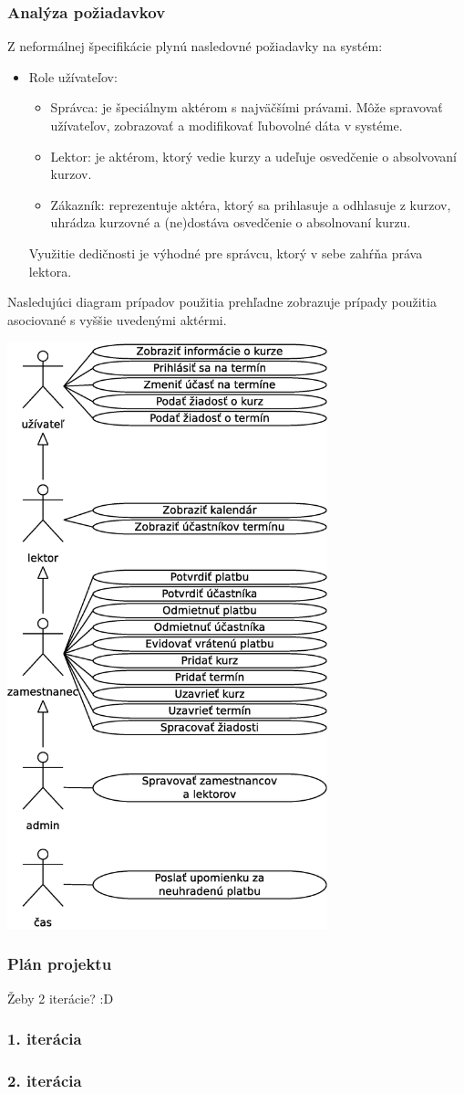 \documentclass[12pt,a4paper,titlepage,final]{report}
\begin{document}
	\subsubsection{Analýza požiadavkov}
Z neformálnej špecifikácie plynú nasledovné požiadavky na systém:
		\begin{itemize}
			\item Role užívateľov:
			\begin{itemize}
				\item Správca: je špeciálnym aktérom s najväčšími právami. Môže spravovať užívateľov, zobrazovať a modifikovať ľubovolné dáta v systéme.
				\item Lektor: je aktérom, ktorý vedie kurzy a udeľuje osvedčenie o absolvovaní kurzov.
				\item Zákazník: reprezentuje aktéra, ktorý sa prihlasuje a odhlasuje z kurzov, uhrádza kurzovné a (ne)dostáva osvedčenie o absolnovaní kurzu.
			\end{itemize}
Využitie dedičnosti je výhodné pre správcu, ktorý v sebe zahŕňa práva lektora.
		\end{itemize}
Nasledujúci diagram prípadov použitia prehľadne zobrazuje prípady použitia asociované s vyššie uvedenými aktérmi.
		\begin{center}
			\captionsetup{type=figure}
			\includegraphics[height=17cm]{img/use_case.eps}
		\end{center}
	\subsubsection{Plán projektu}
Žeby 2 iterácie? :D
	\subsubsection{1. iterácia}
	\subsubsection{2. iterácia}
\end{document}

